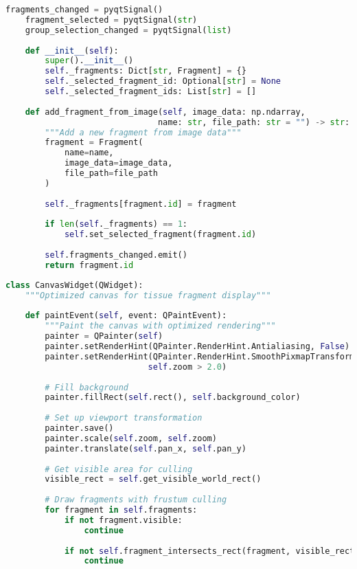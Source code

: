 \documentclass[12pt,a4paper]{report}
\begin{document}
\begin{}
\begin{}
\begin{}
\begin{}
\begin{lstlisting}[language=Python, caption=Gestionnaire de fragments - Classe principale]
    fragments_changed = pyqtSignal()
    fragment_selected = pyqtSignal(str)
    group_selection_changed = pyqtSignal(list)
    
    def __init__(self):
        super().__init__()
        self._fragments: Dict[str, Fragment] = {}
        self._selected_fragment_id: Optional[str] = None
        self._selected_fragment_ids: List[str] = []
    
    def add_fragment_from_image(self, image_data: np.ndarray, 
                               name: str, file_path: str = "") -> str:
        """Add a new fragment from image data"""
        fragment = Fragment(
            name=name,
            image_data=image_data,
            file_path=file_path
        )
        
        self._fragments[fragment.id] = fragment
        
        if len(self._fragments) == 1:
            self.set_selected_fragment(fragment.id)
            
        self.fragments_changed.emit()
        return fragment.id
\end{lstlisting}

\begin{lstlisting}[language=Python, caption=Canvas Widget - Rendu haute performance]
class CanvasWidget(QWidget):
    """Optimized canvas for tissue fragment display"""
    
    def paintEvent(self, event: QPaintEvent):
        """Paint the canvas with optimized rendering"""
        painter = QPainter(self)
        painter.setRenderHint(QPainter.RenderHint.Antialiasing, False)
        painter.setRenderHint(QPainter.RenderHint.SmoothPixmapTransform, 
                             self.zoom > 2.0)
        
        # Fill background
        painter.fillRect(self.rect(), self.background_color)
        
        # Set up viewport transformation
        painter.save()
        painter.scale(self.zoom, self.zoom)
        painter.translate(self.pan_x, self.pan_y)
        
        # Get visible area for culling
        visible_rect = self.get_visible_world_rect()
        
        # Draw fragments with frustum culling
        for fragment in self.fragments:
            if not fragment.visible:
                continue
            
            if not self.fragment_intersects_rect(fragment, visible_rect):
                continue
                

\end{lstlisting}
\end{}
\end{}
\end{}
\end{}
\end{document}
